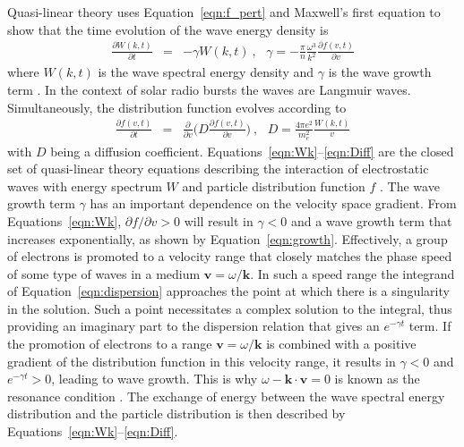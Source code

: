 Quasi-linear theory uses Equation~\ref{eqn:f_pert} and Maxwell's first equation to show that the time evolution of the wave energy density is
\begin{eqnarray}
\frac{\partial W(k,t)}{\partial t} &=& -\gamma W(k,t)~,~~~\gamma = -\frac{\pi}{n}\frac{\omega^3}{k^2} \frac{\partial f(v,t)}{\partial v}
\label{eqn:Wk}
\end{eqnarray}
where $W(k,t)$ is the wave spectral energy density and $\gamma$ is the wave growth term \citep{vedenov1963}. In the context of solar radio bursts the waves are Langmuir waves.
Simultaneously, the distribution function evolves according to 
\begin{eqnarray}
\frac{\partial f(v,t)}{\partial t} &=& \frac{\partial }{\partial v} \bigg(D\frac{\partial f(v,t)}{\partial v}\bigg)~,~~~D = \frac{4\pi e^2}{m_e^2}\frac{W(k,t)}{v}
\label{eqn:Diff}
\end{eqnarray}
with $D$ being a diffusion coefficient. Equations~\ref{eqn:Wk}--\ref{eqn:Diff} are the closed set of quasi-linear theory equations describing the interaction of electrostatic waves with energy spectrum $W$ and particle distribution function $f$ \citep{vedenov1963, kontar2001}. The wave growth term $\gamma$ has an important dependence on the velocity space gradient. From Equations~\ref{eqn:Wk}, $\partial f/\partial v >0$ will result in $\gamma <0$ and a wave growth term that increases exponentially, as shown by Equation~\ref{eqn:growth}. Effectively, a group of electrons is promoted to a velocity range that closely matches the phase speed of some type of waves in a medium $\mathbf{v} = \omega/\mathbf{k}$. In such a speed range the integrand of Equation~\ref{eqn:dispersion} approaches the point at which there is a singularity in the solution. Such a point necessitates a complex solution to the integral, thus providing an imaginary part to the dispersion relation that gives an $e^{-\gamma t}$ term. If the promotion of electrons to a range $\mathbf{v} = \omega/\mathbf{k}$ is combined with a positive gradient of the distribution function in this velocity range, it results in $\gamma < 0$ and $e^{-\gamma t}>0$, leading to wave growth. This is why $\omega - \mathbf{k\cdot v}=0$ is known as the resonance condition \citep{melrose1989}. The exchange of energy between the wave spectral energy distribution and the particle distribution is then described by Equations~\ref{eqn:Wk}--\ref{eqn:Diff}.

